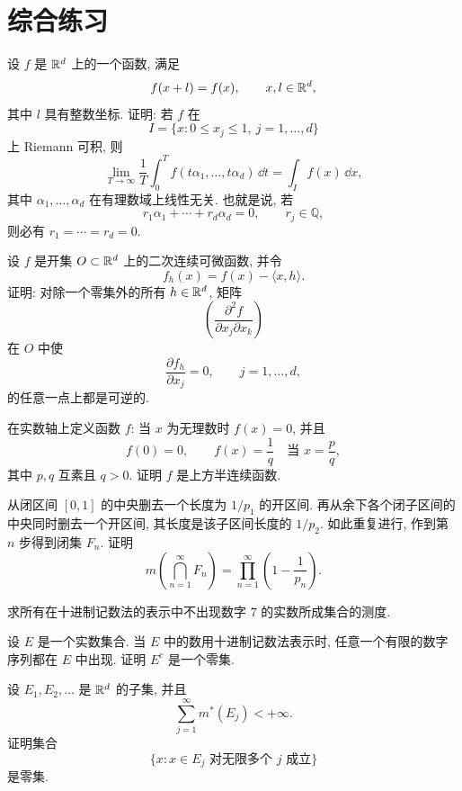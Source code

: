 \chapter{综合练习}
\label{chap:comprehensive-exercises}

\begin{exer}
	设 \(f\) 是 \(\mathbb{R}^d\) 上的一个函数, 满足
	\[
	f(x+l)=f(x),\qquad x,l\in\mathbb{R}^d,
	\]
	其中 \(l\) 具有整数坐标. 证明: 若 \(f\) 在
	\[
	I=\{x:0\leq x_j\leq 1,\ j=1,\ldots,d\}
	\]
	上 Riemann 可积, 则
	\[
	\lim_{T\to\infty}\frac1T\int_0^T
	f(t\alpha_1,\ldots,t\alpha_d)\,\dd t
	=
	\int_I f(x)\,\dd x,
	\]
	其中 \(\alpha_1,\ldots,\alpha_d\) 在有理数域上线性无关. 也就是说, 若
	\[
	r_1\alpha_1+\cdots+r_d\alpha_d=0,
	\qquad r_j\in\mathbb Q,
	\]
	则必有 \(r_1=\cdots=r_d=0\).
\end{exer}

\begin{exer}
	设 \(f\) 是开集 \(O\subset\mathbb{R}^d\) 上的二次连续可微函数, 并令
	\[
	f_h(x)=f(x)-\langle x,h\rangle .
	\]
	证明: 对除一个零集外的所有 \(h\in\mathbb{R}^d\), 矩阵
	\[
	\left(\frac{\partial^2 f}{\partial x_j\partial x_k}\right)
	\]
	在 \(O\) 中使
	\[
	\frac{\partial f_h}{\partial x_j}=0,
	\qquad j=1,\ldots,d,
	\]
	的任意一点上都是可逆的.
\end{exer}

\begin{exer}
	在实数轴上定义函数 \(f\): 当 \(x\) 为无理数时 \(f(x)=0\), 并且
	\[
	f(0)=0,
	\qquad
	f(x)=\frac1q\quad\text{当 }x=\frac pq,
	\]
	其中 \(p,q\) 互素且 \(q>0\). 证明 \(f\) 是上方半连续函数.
\end{exer}

\begin{exer}
	从闭区间 \([0,1]\) 的中央删去一个长度为 \(1/p_1\) 的开区间. 再从余下各个闭子区间的中央同时删去一个开区间, 其长度是该子区间长度的 \(1/p_2\). 如此重复进行, 作到第 \(n\) 步得到闭集 \(F_n\). 证明
	\[
	m\left(\bigcap_{n=1}^{\infty}F_n\right)
	=
	\prod_{n=1}^{\infty}\left(1-\frac1{p_n}\right).
	\]
\end{exer}

\begin{exer}
	求所有在十进制记数法的表示中不出现数字 \(7\) 的实数所成集合的测度.
\end{exer}

\begin{exer}
	设 \(E\) 是一个实数集合. 当 \(E\) 中的数用十进制记数法表示时, 任意一个有限的数字序列都在 \(E\) 中出现. 证明 \(E^c\) 是一个零集.
\end{exer}

\begin{exer}
	设 \(E_1,E_2,\ldots\) 是 \(\mathbb{R}^d\) 的子集, 并且
	\[
	\sum_{j=1}^{\infty}m^*(E_j)<+\infty.
	\]
	证明集合
	\[
	\{x:x\in E_j\text{ 对无限多个 }j\text{ 成立}\}
	\]
	是零集.
\end{exer}

